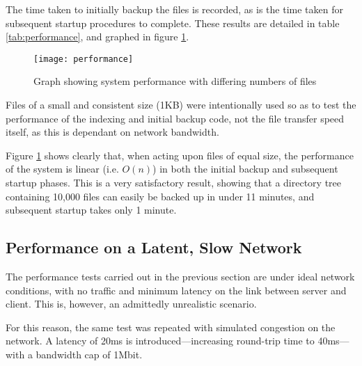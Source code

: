The time taken to initially backup the files is recorded, as is the time taken
for subsequent startup procedures to complete. These results are detailed in
table \ref{tab:performance}, and graphed in figure \ref{fig:performance-graph}.

\begin{figure}
    \begin{center}
        \texttt{[image: performance]}
    \end{center}
    \caption{Graph showing system performance with differing numbers of files}
    \label{fig:performance-graph}
\end{figure}

Files of a small and consistent size (1KB) were intentionally used so as to
test the performance of the indexing and initial backup code, not the file
transfer speed itself, as this is dependant on network bandwidth.

Figure \ref{fig:performance-graph} shows clearly that, when acting upon files
of equal size, the performance of the system is linear (i.e. $O(n)$) in both
the initial backup and subsequent startup phases. This is a very satisfactory
result, showing that a directory tree containing 10,000 files can easily be
backed up in under 11 minutes, and subsequent startup takes only 1 minute.

\subsection{Performance on a Latent, Slow Network}

The performance tests carried out in the previous section are under ideal
network conditions, with no traffic and minimum latency on the link between
server and client. This is, however, an admittedly unrealistic scenario.

For this reason, the same test was repeated with simulated congestion on the
network. A latency of 20ms is introduced---increasing round-trip time to
40ms---with a bandwidth cap of 1Mbit.

